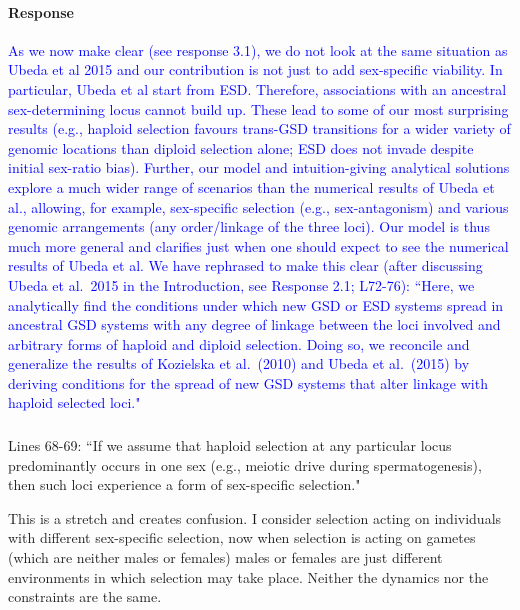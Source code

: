\documentclass[10pt,letterpaper]{article}
\begin{document}
\noindent\paragraph{Response}
\textcolor{blue}{
As we now make clear (see response 3.1), we do not look at the same situation as Ubeda et al 2015 and our contribution is not just to add sex-specific viability. 
In particular, Ubeda et al start from ESD. 
Therefore, associations with an ancestral sex-determining locus cannot build up. 
These lead to some of our most surprising results (e.g., haploid selection favours trans-GSD transitions for a wider variety of genomic locations than diploid selection alone; ESD does not invade despite initial sex-ratio bias).
Further, our model and intuition-giving analytical solutions explore a much wider range of scenarios than the numerical results of Ubeda et al., allowing, for example, sex-specific selection (e.g., sex-antagonism) and various genomic arrangements (any order/linkage of the three loci).
Our model is thus much more general and clarifies just when one should expect to see the numerical results of Ubeda et al.
We have rephrased to make this clear (after discussing Ubeda et al.\ 2015 in the Introduction, see Response 2.1; L72-76): ``Here, we analytically find the conditions under which new GSD or ESD systems spread in ancestral GSD systems with any degree of linkage between the loci involved and arbitrary forms of haploid and diploid selection. 
Doing so, we reconcile and generalize the results of Kozielska et al.\ (2010) and Ubeda et al.\ (2015) by deriving conditions for the spread of new GSD systems that alter linkage with haploid selected loci."
}

\noindent\subsubsection{}
Lines 68-69: ``If we assume that haploid selection at any particular locus predominantly occurs in one sex (e.g., meiotic drive during spermatogenesis), then such loci experience a form of sex-specific selection." 

This is a stretch and creates confusion. I consider selection acting on individuals with different sex-specific selection, now when selection is acting on gametes (which are neither males or females) males or females are just different environments in which selection may take place. Neither the dynamics nor the constraints are the same. 
\end{document}
